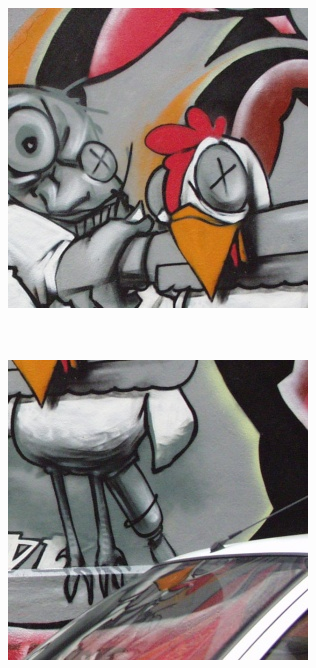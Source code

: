 \documentclass[review]{elsarticle}
\begin{document}
\begin{figure}[htb]
    \centering
    \begin{subfigure}[t]{0.16\columnwidth}
        \centering
        \includegraphics[width=1\columnwidth]{images/acr/patches/patch_1_1}
    \end{subfigure}%
    ~~ %
    \begin{subfigure}[t]{0.16\columnwidth}
        \centering
        \includegraphics[width=1\columnwidth]{images/acr/patches/patch_2_1}

\end{subfigure}
\end{figure}
\end{document}
